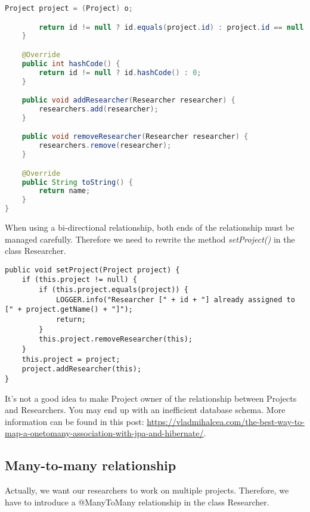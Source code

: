 \begin{lstlisting}[frame=single, language=java]
		Project project = (Project) o;

		return id != null ? id.equals(project.id) : project.id == null;
	}

	@Override
	public int hashCode() {
		return id != null ? id.hashCode() : 0;
	}

	public void addResearcher(Researcher researcher) {
		researchers.add(researcher);
	}

	public void removeResearcher(Researcher researcher) {
		researchers.remove(researcher);
	}

	@Override
	public String toString() {
		return name;
	}
}
\end{lstlisting}

When using a bi-directional relationship, both ends of the relationship must be managed carefully.
Therefore we need to rewrite the method \textit{setProject()} in the class Researcher.

\begin{lstlisting}
public void setProject(Project project) {
	if (this.project != null) {
		if (this.project.equals(project)) {
			LOGGER.info("Researcher [" + id + "] already assigned to [" + project.getName() + "]");
			return;
		}
		this.project.removeResearcher(this);
	}
	this.project = project;
	project.addResearcher(this);
}
\end{lstlisting}
 
It's not a good idea to make Project owner of the relationship between Projects and Researchers.  You may end up with an inefficient database schema. More information can be found in this post: \url{https://vladmihalcea.com/the-best-way-to-map-a-onetomany-association-with-jpa-and-hibernate/}.


\subsection{Many-to-many relationship}

Actually, we want our researchers to work on multiple projects. Therefore,  we have to introduce a @ManyToMany relationship in the class Researcher. 

